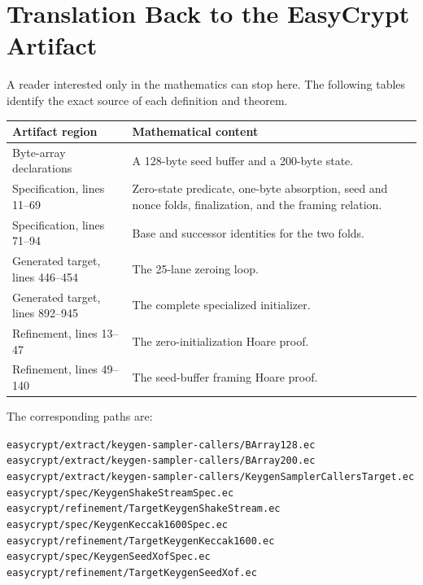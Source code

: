 \documentclass[11pt]{article}
\theoremstyle{definition}
\theoremstyle{plain}
\theoremstyle{remark}
\newcommand{\code}[1]{\nolinkurl{#1}}
\begin{document}
\section{Translation Back to the EasyCrypt Artifact}

A reader interested only in the mathematics can stop here.  The following
tables identify the exact source of each definition and theorem.

\noindent\begin{tabularx}{\textwidth}{>{\raggedright\arraybackslash}p{}X}
\toprule
Artifact region & Mathematical content \\
\midrule
Byte-array declarations & A 128-byte seed buffer and a 200-byte state. \\
Specification, lines 11--69 & Zero-state predicate, one-byte absorption,
seed and nonce folds, finalization, and the framing relation. \\
Specification, lines 71--94 & Base and successor identities for the two
folds. \\
Generated target, lines 446--454 & The 25-lane zeroing loop. \\
Generated target, lines 892--945 & The complete specialized initializer. \\
Refinement, lines 13--47 & The zero-initialization Hoare proof. \\
Refinement, lines 49--140 & The seed-buffer framing Hoare proof. \\
\bottomrule
\end{tabularx}

The corresponding paths are:
\begin{center}
\footnotesize
\code{easycrypt/extract/keygen-sampler-callers/BArray128.ec}\\
\code{easycrypt/extract/keygen-sampler-callers/BArray200.ec}\\
\code{easycrypt/extract/keygen-sampler-callers/KeygenSamplerCallersTarget.ec}\\
\code{easycrypt/spec/KeygenShakeStreamSpec.ec}\\
\code{easycrypt/refinement/TargetKeygenShakeStream.ec}\\
\code{easycrypt/spec/KeygenKeccak1600Spec.ec}\\
\code{easycrypt/refinement/TargetKeygenKeccak1600.ec}\\
\code{easycrypt/spec/KeygenSeedXofSpec.ec}\\
\code{easycrypt/refinement/TargetKeygenSeedXof.ec}
\end{center}
\end{document}
